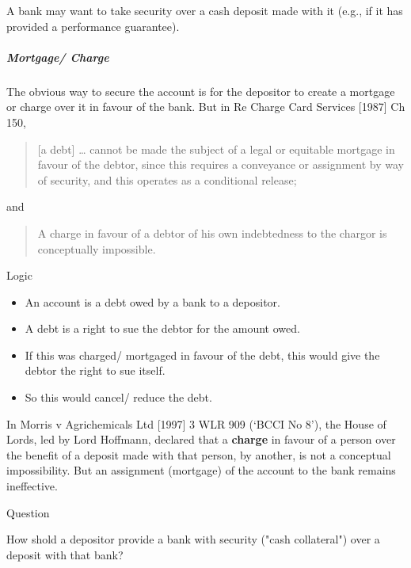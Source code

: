 \documentclass[
]{article}
\providecommand{\tightlist}{%
  \setlength{\itemsep}{0pt}\setlength{\parskip}{0pt}}
\newenvironment{env-486fc4cd-eb32-4215-aaa2-fc77a67eebc5}
{
    \savenotes\tcolorbox[blanker,breakable,left=5pt,borderline west={2pt}{-4pt}{blue}]
}
{
    \endtcolorbox\spewnotes
}
\newenvironment{env-a9aa42a3-f5ef-44bc-9cb3-81fc5caedba7}
{
    \savenotes\tcolorbox[blanker,breakable,left=5pt,borderline west={2pt}{-4pt}{gray}]
}
{
    \endtcolorbox\spewnotes
}
\begin{document}
A bank may want to take security over a cash deposit made with it (e.g.,
if it has provided a performance guarantee).

\hypertarget{mortgage-charge}{%
\subparagraph{Mortgage/ Charge}\label{mortgage-charge}}

The obvious way to secure the account is for the depositor to create a
mortgage or charge over it in favour of the bank. But in Re Charge Card
Services {[}1987{]} Ch 150,

\begin{quote}
{[}a debt{]} \ldots{} cannot be made the subject of a legal or equitable
mortgage in favour of the debtor, since this requires a conveyance or
assignment by way of security, and this operates as a conditional
release;
\end{quote}

and

\begin{quote}
A charge in favour of a debtor of his own indebtedness to the chargor is
conceptually impossible.
\end{quote}

\begin{env-486fc4cd-eb32-4215-aaa2-fc77a67eebc5}

Logic

\begin{itemize}
\tightlist
\item
  An account is a debt owed by a bank to a depositor.
\item
  A debt is a right to sue the debtor for the amount owed.
\item
  If this was charged/ mortgaged in favour of the debt, this would give
  the debtor the right to sue itself.
\item
  So this would cancel/ reduce the debt.
\end{itemize}

\end{env-486fc4cd-eb32-4215-aaa2-fc77a67eebc5}

In Morris v Agrichemicals Ltd {[}1997{]} 3 WLR 909 (`BCCI No 8'), the
House of Lords, led by Lord Hoffmann, declared that a \textbf{charge} in
favour of a person over the benefit of a deposit made with that person,
by another, is not a conceptual impossibility. But an assignment
(mortgage) of the account to the bank remains ineffective.

\begin{env-a9aa42a3-f5ef-44bc-9cb3-81fc5caedba7}

Question

How shold a depositor provide a bank with security ("cash collateral")
over a deposit with that bank?

\end{env-a9aa42a3-f5ef-44bc-9cb3-81fc5caedba7}
\end{document}
